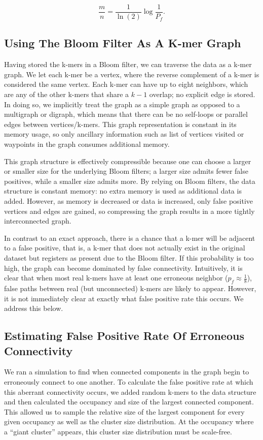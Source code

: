 \documentclass[12pt]{article} \usepackage{simplemargins}
\begin{document}
\begin{displaymath}
\frac{m}{n} = \frac{1}{\ln(2)} \log{\frac{1}{P_f}}.
\end{displaymath}

\subsection{Using The Bloom Filter As A K-mer Graph}
Having stored the k-mers in a Bloom filter, we can traverse
the data as a k-mer graph. We let each k-mer be a vertex, where
the reverse complement of a k-mer is considered the same
vertex. Each k-mer can
have up to eight neighbors, which are any of the other k-mers that
 share a $k-1$
overlap; no explicit edge is stored. In doing so, we implicitly 
treat the graph as a simple graph as opposed to a multigraph or 
digraph, which means that there can be no self-loops or parallel 
edges between vertices/k-mers. This graph representation is constant 
in its memory usage, so only ancillary information such as list 
of vertices visited or waypoints in the graph consumes additional 
memory.

This graph structure is effectively compressible
because one can choose a larger
or smaller size for the underlying Bloom filters; a larger size admits fewer
false positives, while a smaller size admits more. By relying on Bloom
filters, the data structure is constant memory: no extra memory is
used as additional data is added. However, as memory is decreased or data
is increased, only false positive vertices and edges are gained, so
compressing the graph results in a more tightly interconnected graph.

In contrast to an exact approach, there is a chance that a k-mer 
will be adjacent to a false positive,
that is, a k-mer
that does not actually exist in the original dataset but registers as present  
due to 
the Bloom filter. If this probability is too high, the 
graph can become dominated by false connectivity. 
Intuitively, it is clear that when most real k-mers
have at least one erroneous neighbor ($p_f \approx \frac{1}{8}$), 
false paths between real (but unconnected) k-mers are likely to 
appear. However, it is not immediately clear at exactly what 
false positive rate this occurs. We address this below.  %

\subsection{Estimating False Positive Rate Of Erroneous Connectivity}
We ran a simulation to find when connected components in the graph 
begin to erroneously connect to one another.
To calculate the false positive rate at which this aberrant 
connectivity occurs, 
we added random k-mers to the data structure 
and then calculated the occupancy and size of 
the largest connected 
component. This allowed us to sample the relative size of 
the largest component for every 
given occupancy as well as the cluster size distribution. 
At the occupancy where a ``giant cluster'' appears, this cluster size distribution 
must be scale-free\cite{stauffer1979scaling}. 
\end{document}
